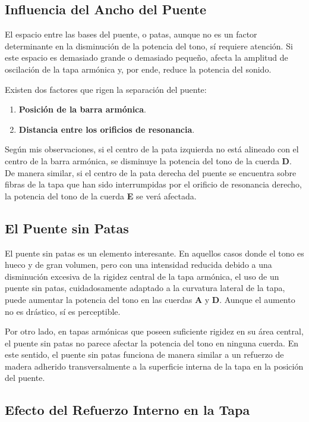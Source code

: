\documentclass[12pt]{book}
\begin{document}
\subsection*{Influencia del Ancho del Puente}

El espacio entre las bases del puente, o patas, aunque no es un factor determinante en la disminución de la potencia del tono, sí requiere atención. Si este espacio es demasiado grande o demasiado pequeño, afecta la amplitud de oscilación de la tapa armónica y, por ende, reduce la potencia del sonido.

Existen dos factores que rigen la separación del puente:
\begin{enumerate}
    \item \textbf{Posición de la barra armónica}.
    \item \textbf{Distancia entre los orificios de resonancia}.
\end{enumerate}

Según mis observaciones, si el centro de la pata izquierda no está alineado con el centro de la barra armónica, se disminuye la potencia del tono de la cuerda \textbf{D}. De manera similar, si el centro de la pata derecha del puente se encuentra sobre fibras de la tapa que han sido interrumpidas por el orificio de resonancia derecho, la potencia del tono de la cuerda \textbf{E} se verá afectada.

\subsection*{El Puente sin Patas}

El puente sin patas es un elemento interesante. En aquellos casos donde el tono es hueco y de gran volumen, pero con una intensidad reducida debido a una disminución excesiva de la rigidez central de la tapa armónica, el uso de un puente sin patas, cuidadosamente adaptado a la curvatura lateral de la tapa, puede aumentar la potencia del tono en las cuerdas \textbf{A} y \textbf{D}. Aunque el aumento no es drástico, sí es perceptible.

Por otro lado, en tapas armónicas que poseen suficiente rigidez en su área central, el puente sin patas no parece afectar la potencia del tono en ninguna cuerda. En este sentido, el puente sin patas funciona de manera similar a un refuerzo de madera adherido transversalmente a la superficie interna de la tapa en la posición del puente.

\subsection*{Efecto del Refuerzo Interno en la Tapa}
\end{document}
